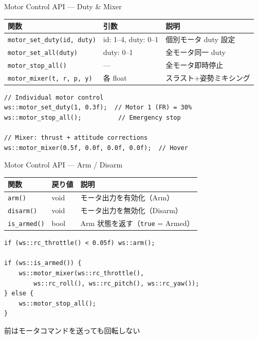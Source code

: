 \begin{frame}[fragile]{Motor Control API --- Duty \& Mixer}
  \vspace{0.3em}
  {\small
  \begin{tabular}{lll}
    \hline
    \textbf{関数} & \textbf{引数} & \textbf{説明} \\
    \hline
    \texttt{motor\_set\_duty(id, duty)} & id: 1--4, duty: 0--1 & 個別モータ duty 設定 \\
    \texttt{motor\_set\_all(duty)}      & duty: 0--1           & 全モータ同一 duty \\
    \texttt{motor\_stop\_all()}         & ---                   & 全モータ即時停止 \\
    \texttt{motor\_mixer(t, r, p, y)}   & 各 float             & スラスト+姿勢ミキシング \\
    \hline
  \end{tabular}
  }

  \vspace{0.3em}

  \begin{lstlisting}[style=sfcpp, basicstyle=\ttfamily\scriptsize]
// Individual motor control
ws::motor_set_duty(1, 0.3f);  // Motor 1 (FR) = 30%
ws::motor_stop_all();          // Emergency stop

// Mixer: thrust + attitude corrections
ws::motor_mixer(0.5f, 0.0f, 0.0f, 0.0f);  // Hover
  \end{lstlisting}
\end{frame}

\begin{frame}[fragile]{Motor Control API --- Arm / Disarm}
  \vspace{0.3em}
  {\small
  \begin{tabular}{lll}
    \hline
    \textbf{関数} & \textbf{戻り値} & \textbf{説明} \\
    \hline
    \texttt{arm()}       & void & モータ出力を有効化（Arm） \\
    \texttt{disarm()}    & void & モータ出力を無効化（Disarm） \\
    \texttt{is\_armed()} & bool & Arm 状態を返す（\texttt{true} = Armed） \\
    \hline
  \end{tabular}
  }

  \vspace{0.3em}

  \begin{lstlisting}[style=sfcpp, basicstyle=\ttfamily\scriptsize]
if (ws::rc_throttle() < 0.05f) ws::arm();

if (ws::is_armed()) {
    ws::motor_mixer(ws::rc_throttle(),
        ws::rc_roll(), ws::rc_pitch(), ws::rc_yaw());
} else {
    ws::motor_stop_all();
}
  \end{lstlisting}

  \vspace{0.2em}
  {\footnotesize {}  前はモータコマンドを送っても回転しない}
\end{frame}

